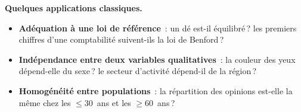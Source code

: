 \smallskip

\textbf{Quelques applications classiques.}
\begin{itemize}\setlength{\itemsep}{0.15em}
  \item \textbf{Adéquation à une loi de référence}~: un dé est-il équilibré\,? les premiers chiffres d'une comptabilité suivent-ils la loi de Benford\,?
  \item \textbf{Indépendance entre deux variables qualitatives}~: la couleur des yeux dépend-elle du sexe\,? le secteur d'activité dépend-il de la région\,?
  \item \textbf{Homogénéité entre populations}~: la répartition des opinions est-elle la même chez les $\le 30$~ans et les $\ge 60$~ans\,?
\end{itemize}

\medskip

